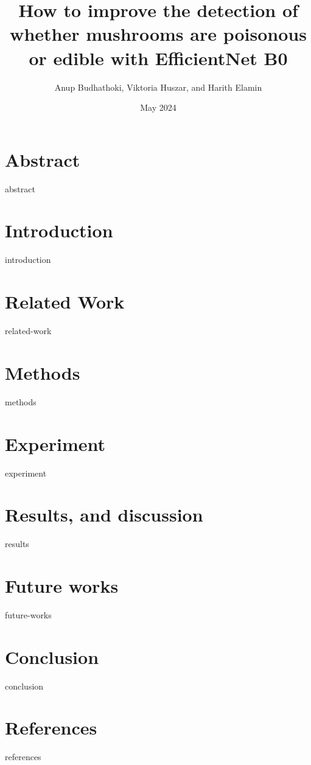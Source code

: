 \documentclass{article}
\title{How to improve the detection of whether mushrooms are poisonous or edible with EfficientNet B0}
\author{ Anup Budhathoki, Viktoria Huszar, and Harith Elamin}
\affil{Department of Computer Science, Oslo metropolitan university, Norway}
\date{May 2024}
\begin{document}
\maketitle

\begin{multicols}{2}
\section{Abstract}
{abstract}
\section{Introduction}
{introduction}
\section{Related Work}
{related-work}
\section{Methods}
{methods}
\section{Experiment}
{experiment}
\section{Results, and discussion}
{results}
\section{Future works}
{future-works}
\section{Conclusion}
{conclusion}
\section{References}
{references}
\end{multicols}
\end{document}
